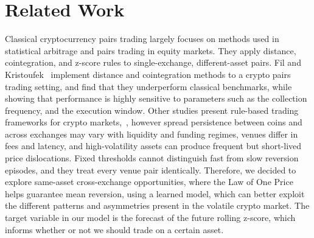 \section{Related Work}\label{sec:related}

Classical cryptocurrency pairs trading largely focuses on methods used in statistical arbitrage and pairs trading in equity markets. They apply distance, cointegration, and z-score rules to  single-exchange, different-asset pairs. Fil and Kristoufek~\cite{fil2020pairs} implement distance and cointegration methods to a crypto pairs trading setting, and find that they underperform classical benchmarks, while showing that performance is highly sensitive to parameters such as the collection frequency, and the execution window. Other studies present rule-based trading frameworks for crypto markets,~\cite{tadi2021evaluation, ko2023pairs, tadi2025copula, palazzi2025trading}, however spread persistence between coins and across exchanges may vary with liquidity and funding regimes, venues differ in fees and latency, and high-volatility assets can produce frequent but short-lived price dislocations. Fixed thresholds cannot distinguish fast from slow reversion episodes, and they treat every venue pair identically. Therefore, we decided to explore same-asset cross-exchange opportunities, where the Law of One Price helps guarantee mean reversion, using a learned model, which can better exploit the different patterns and asymmetries present in the volatile crypto market. The target variable in our model is the forecast of the future rolling z-score, which informs whether or not we should trade on a certain asset.


